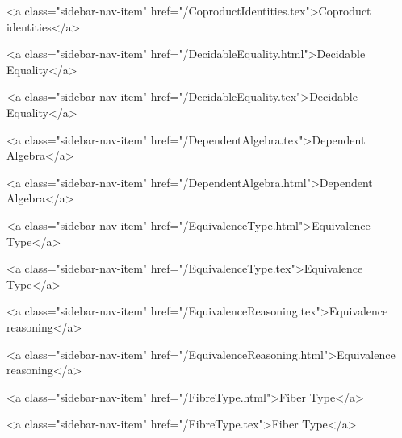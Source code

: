       
        
          <a class="sidebar-nav-item" href="/CoproductIdentities.tex">Coproduct identities</a>
        
      
    
      
        
          <a class="sidebar-nav-item" href="/DecidableEquality.html">Decidable Equality</a>
        
      
    
      
        
          <a class="sidebar-nav-item" href="/DecidableEquality.tex">Decidable Equality</a>
        
      
    
      
        
          <a class="sidebar-nav-item" href="/DependentAlgebra.tex">Dependent Algebra</a>
        
      
    
      
        
          <a class="sidebar-nav-item" href="/DependentAlgebra.html">Dependent Algebra</a>
        
      
    
      
        
          <a class="sidebar-nav-item" href="/EquivalenceType.html">Equivalence Type</a>
        
      
    
      
        
          <a class="sidebar-nav-item" href="/EquivalenceType.tex">Equivalence Type</a>
        
      
    
      
        
          <a class="sidebar-nav-item" href="/EquivalenceReasoning.tex">Equivalence reasoning</a>
        
      
    
      
        
          <a class="sidebar-nav-item" href="/EquivalenceReasoning.html">Equivalence reasoning</a>
        
      
    
      
        
          <a class="sidebar-nav-item" href="/FibreType.html">Fiber Type</a>
        
      
    
      
        
          <a class="sidebar-nav-item" href="/FibreType.tex">Fiber Type</a>
        
